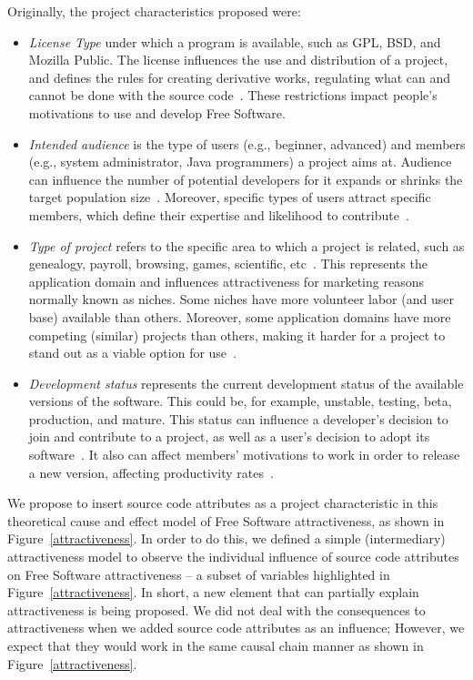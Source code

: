 \documentclass[conference]{IEEEtran}
\begin{document}
Originally, the project characteristics proposed were:
\begin{itemize}
%
\item \emph{License Type} under which a program is available, such as GPL, BSD, 
and Mozilla Public.
%
The license influences the use and distribution of a project, and defines the rules for 
creating derivative works, regulating what can and cannot be done with the
source code~\cite{Santos2010}. These restrictions impact people's motivations
to use and develop Free Software.

%
\item \emph{Intended audience} is the type of users (e.g., beginner, advanced)
and members (e.g., system administrator, Java programmers) a project aims at.
%
Audience can influence the number of potential developers for it expands or
shrinks the target population size~\cite{johnson2002}.
%
Moreover, specific types of users attract specific members, which define their expertise
and likelihood to contribute~\cite{Santos2010}.

%
\item \emph{Type of project} refers to the specific area to which a project is related, 
such as genealogy, payroll, browsing, games, scientific, etc~\cite{Crowston2002}.
%
This represents the application domain and influences attractiveness for
marketing reasons normally known as niches.
%
Some niches have more volunteer labor (and user base) available than others.
%
Moreover, some application domains have more competing (similar) projects than
others, making it harder for a project to stand out as a viable option for
use~\cite{johnson2002}.
%
\item \emph{Development status} represents the current development
status of the available versions of the software. 
%
This could be, for example, unstable, testing, beta, production, and mature.
%
This status can influence a developer's decision to join and contribute to a
project, as well as a user's decision to adopt its software~\cite{Santos2010}.
%
It also can affect members' motivations to work in order to release a new version,
affecting productivity rates~\cite{raja2006,Stewart2006}. 

\end{itemize}

We propose to insert source code attributes as a project
characteristic in this theoretical cause and effect model of Free Software
attractiveness, as shown in Figure~\ref{attractiveness}.
%
In order to do this, we defined a simple (intermediary) attractiveness model
to observe the individual influence of source code attributes on Free
Software attractiveness -- a subset of variables highlighted in
Figure~\ref{attractiveness}.
%
In short, a new element that can partially explain attractiveness is being proposed.
%
We did not deal with the consequences to attractiveness when we added source
code attributes as an influence;
%
However, we expect that they would work in the same causal chain manner
as shown in Figure~\ref{attractiveness}.
\end{document}
